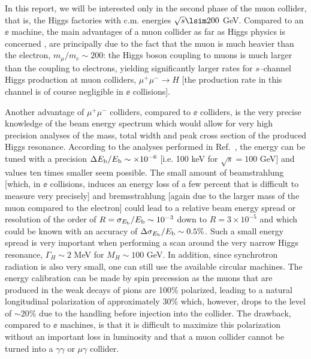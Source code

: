 In this report, we will be interested only in the second phase of the muon
collider, that is, the Higgs factories with c.m. energies $\sqrt s \lsim 200$
GeV. Compared to an $\ee$ machine, the main advantages of a muon collider as
far as Higgs physics is concerned \cite{mu-Rev1,mu-Rev2,mu-Rev3,mu-Rev4}, are
principally due to the fact that the muon is much heavier than the electron,
$m_\mu/m_e \sim 200$: the Higgs boson coupling to muons is much larger than the
coupling to electrons, yielding significantly larger rates for $s$--channel
Higgs production at muon colliders, $\mu^+ \mu^- \to H$ [the production rate in
this channel is of course negligible in $\ee$ collisions].\s


Another advantage of $\mu^+\mu^-$ colliders, compared to $\ee$ colliders, is
the very precise knowledge of the beam energy spectrum which would allow for
very high precision analyses of the mass, total width and peak cross section of
the produced Higgs resonance. According to the analyses performed in
Ref.~\cite{mu-machine1,mu-machine2}, the energy can be tuned with a precision
$\Delta E_{\rm b}/E_{\rm b} \sim \times 10^{-6}$ [i.e. 100 keV for $\sqrt 
s\!=\! 100$ GeV] and values ten times smaller seem possible. 
The small amount of beamstrahlung [which, in $\ee$ collisions, induces an
energy loss of a few percent that is difficult to measure very precisely] and
bremsstrahlung [again due to the larger mass of the muon compared to the
electron] could lead to a relative beam energy spread or resolution of the
order of $R= \sigma_{ E_{\rm b} }/E_{\rm b} \sim 10^{-3}$ down to $R= 3 \times
10^{-5}$ and which could be known with an accuracy of $ \Delta \sigma_{E_{\rm
b} }/E_{\rm b} \sim 0.5\%$. Such a small energy spread is very important when
performing a scan around the very narrow Higgs resonance, $\Gamma_H \sim 
2$ MeV for $M_H \sim 100$ GeV. In addition, since synchrotron radiation is also
very small, one can still use the available circular machines. 
The energy calibration can be made by spin precession as the muons that are
produced in the weak decays of pions are 100\% polarized, leading to a natural
longitudinal polarization of approximately 30\% which, however, drops to the
level of $\sim 20\%$ due to the handling before injection into the collider. The
drawback, compared to $\ee$ machines, is that it is difficult to maximize this 
polarization without an important loss in luminosity and that a muon collider 
cannot be turned into a $\gamma \gamma$ or $\mu \gamma$ collider.\s

